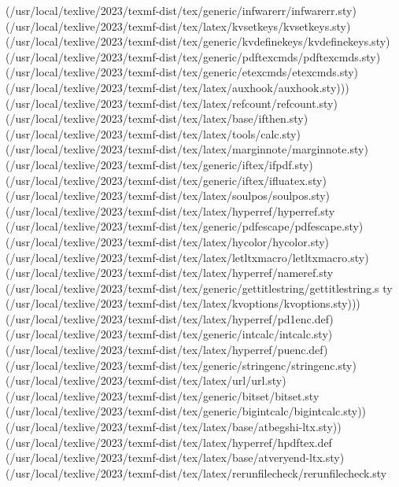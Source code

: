 (/usr/local/texlive/2023/texmf-dist/tex/generic/infwarerr/infwarerr.sty)
(/usr/local/texlive/2023/texmf-dist/tex/latex/kvsetkeys/kvsetkeys.sty)
(/usr/local/texlive/2023/texmf-dist/tex/generic/kvdefinekeys/kvdefinekeys.sty)
(/usr/local/texlive/2023/texmf-dist/tex/generic/pdftexcmds/pdftexcmds.sty)
(/usr/local/texlive/2023/texmf-dist/tex/generic/etexcmds/etexcmds.sty)
(/usr/local/texlive/2023/texmf-dist/tex/latex/auxhook/auxhook.sty)))
(/usr/local/texlive/2023/texmf-dist/tex/latex/refcount/refcount.sty)
(/usr/local/texlive/2023/texmf-dist/tex/latex/base/ifthen.sty)
(/usr/local/texlive/2023/texmf-dist/tex/latex/tools/calc.sty)
(/usr/local/texlive/2023/texmf-dist/tex/latex/marginnote/marginnote.sty)
(/usr/local/texlive/2023/texmf-dist/tex/generic/iftex/ifpdf.sty)
(/usr/local/texlive/2023/texmf-dist/tex/generic/iftex/ifluatex.sty)
(/usr/local/texlive/2023/texmf-dist/tex/latex/soulpos/soulpos.sty)
(/usr/local/texlive/2023/texmf-dist/tex/latex/hyperref/hyperref.sty
(/usr/local/texlive/2023/texmf-dist/tex/generic/pdfescape/pdfescape.sty)
(/usr/local/texlive/2023/texmf-dist/tex/latex/hycolor/hycolor.sty)
(/usr/local/texlive/2023/texmf-dist/tex/latex/letltxmacro/letltxmacro.sty)
(/usr/local/texlive/2023/texmf-dist/tex/latex/hyperref/nameref.sty
(/usr/local/texlive/2023/texmf-dist/tex/generic/gettitlestring/gettitlestring.s
ty (/usr/local/texlive/2023/texmf-dist/tex/latex/kvoptions/kvoptions.sty)))
(/usr/local/texlive/2023/texmf-dist/tex/latex/hyperref/pd1enc.def)
(/usr/local/texlive/2023/texmf-dist/tex/generic/intcalc/intcalc.sty)
(/usr/local/texlive/2023/texmf-dist/tex/latex/hyperref/puenc.def)
(/usr/local/texlive/2023/texmf-dist/tex/generic/stringenc/stringenc.sty)
(/usr/local/texlive/2023/texmf-dist/tex/latex/url/url.sty)
(/usr/local/texlive/2023/texmf-dist/tex/generic/bitset/bitset.sty
(/usr/local/texlive/2023/texmf-dist/tex/generic/bigintcalc/bigintcalc.sty))
(/usr/local/texlive/2023/texmf-dist/tex/latex/base/atbegshi-ltx.sty))
(/usr/local/texlive/2023/texmf-dist/tex/latex/hyperref/hpdftex.def
(/usr/local/texlive/2023/texmf-dist/tex/latex/base/atveryend-ltx.sty)
(/usr/local/texlive/2023/texmf-dist/tex/latex/rerunfilecheck/rerunfilecheck.sty

